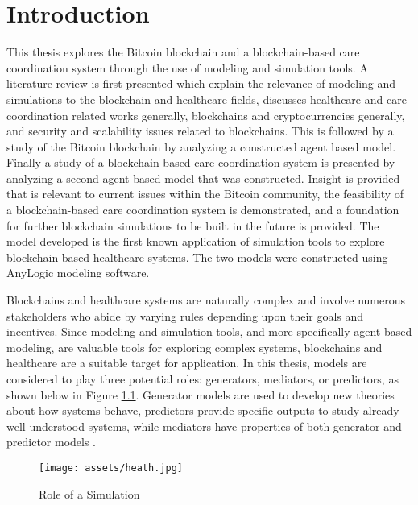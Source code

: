\documentclass[12pt]{report}
\begin{document}
\chapter{Introduction}
This thesis explores the Bitcoin blockchain and a blockchain-based care coordination system through the use of modeling and simulation tools. A literature review is first presented which explain the relevance of modeling and simulations to the blockchain and healthcare fields, discusses healthcare and care coordination related works generally, blockchains and cryptocurrencies generally, and security and scalability issues related to blockchains. This is followed by a study of the Bitcoin blockchain by analyzing a constructed agent based model. Finally a study of a blockchain-based care coordination system is presented by analyzing a second agent based model that was constructed. Insight is provided that is relevant to current issues within the Bitcoin community, the feasibility of a blockchain-based care coordination system is demonstrated, and a foundation for further blockchain simulations to be built in the future is provided. The model developed is the first known application of simulation tools to explore blockchain-based healthcare systems. The two models were constructed using AnyLogic modeling software.

Blockchains and healthcare systems are naturally complex and involve numerous stakeholders who abide by varying rules depending upon their goals and incentives. Since modeling and simulation tools, and more specifically agent based modeling, are valuable tools for exploring complex systems, blockchains and healthcare are a suitable target for application. In this thesis, models are considered to play three potential roles: generators, mediators, or predictors, as shown below in Figure \ref{fig:heath}. Generator models are used to develop new theories about how systems behave, predictors provide specific outputs to study already well understood systems, while mediators have  properties of both generator and predictor models \cite{Heath.2010}.

\begin{figure}[h!]
\begin{center}
\texttt{[image: assets/heath.jpg]}
\caption{Role of a Simulation \cite{Heath.2010}}
\label{fig:heath}
\end{center}
\end{figure}
\end{document}
